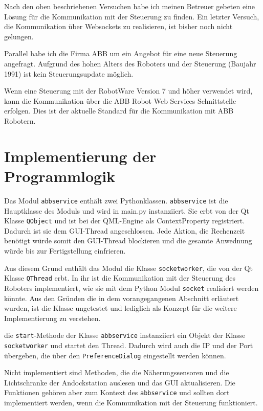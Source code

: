 Nach den oben beschriebenen Versuchen habe ich meinen Betreuer gebeten eine Lösung für die Kommunikation mit der Steuerung zu finden.
Ein letzter Versuch, die Kommunikation über Websockets zu realisieren, ist bisher noch nicht gelungen.

Parallel habe ich die Firma ABB um ein Angebot für eine neue Steuerung angefragt. 
Aufgrund des hohen Alters des Roboters und der Steuerung (Baujahr 1991) ist kein Steuerungsupdate möglich.

Wenn eine Steuerung mit der RobotWare Version 7 und höher verwendet wird, kann die Kommunikation über die ABB Robot Web Services Schnittstelle erfolgen.
Dies ist der aktuelle Standard für die Kommunikation mit ABB Robotern.

\section{Implementierung der Programmlogik}

Das Modul \verb|abbservice| enthält zwei Pythonklassen. \verb|abbservice| ist die Hauptklasse des Moduls und wird in main.py instanziiert.
Sie erbt von der Qt Klasse \verb|QObject| und ist bei der QML-Engine als ContextProperty registriert.
Dadurch ist sie dem GUI-Thread angeschlossen. 
Jede Aktion, die Rechenzeit benötigt würde somit den GUI-Thread blockieren und die gesamte Anwednung würde bis zur Fertigstellung einfrieren.

Aus diesem Grund enthält das Modul die Klasse \verb|socketworker|, die von der Qt Klasse \verb|QThread| erbt.
In ihr ist die Kommunikation mit der Steuerung des Roboters implementiert, wie sie mit dem Python Modul \verb|socket| realisiert werden könnte.
Aus den Gründen die in dem vorangegangenen Abschnitt erläutert wurden, ist die Klasse ungetestet und lediglich als Konzept für die weitere Implementierung zu verstehen.

die \verb|start|-Methode der Klasse \verb|abbservice| instanziiert ein Objekt der Klasse \\ \verb|socketworker| und startet den Thread.
Dadurch wird auch die IP und der Port übergeben, die über den \verb|PreferenceDialog| eingestellt werden können.

Nicht implementiert sind Methoden, die die Näherungssensoren und die Lichtschranke der Andockstation auslesen und das GUI aktualisieren. 
Die Funktionen gehören aber zum Kontext des \verb|abbservice| und sollten dort implementiert werden, wenn die Kommunikation mit der Steuerung funktioniert.

